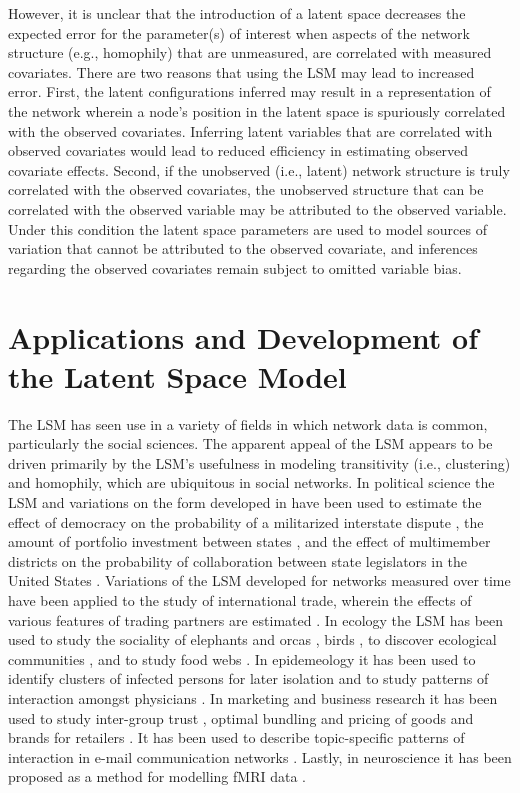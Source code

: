 \documentclass[11pt]{article}
\begin{document}
However, it is unclear that the introduction of a latent space decreases the expected error for the parameter(s) of interest when aspects of the network structure (e.g., homophily) that are unmeasured, are correlated with measured covariates. There are two reasons that using the LSM may lead to increased error. First, the latent configurations inferred may result in a representation of the network wherein a node's position in the latent space is spuriously correlated with the observed covariates. Inferring latent variables that are correlated with observed covariates would lead to reduced efficiency in estimating observed covariate effects. Second, if the unobserved (i.e., latent) network structure is truly correlated with the observed covariates, the unobserved structure that can be correlated with the observed variable may be attributed to the observed variable. Under this condition the latent space parameters are used to model sources of variation that cannot be attributed to the observed covariate, and inferences regarding the observed covariates remain subject to omitted variable bias. 

\section{Applications and Development of the Latent Space Model}

The LSM has seen use in a variety of fields in which network data is common, particularly the social sciences. The apparent appeal of the LSM appears to be driven primarily by the LSM's usefulness in modeling transitivity (i.e., clustering) and homophily, which are ubiquitous in social networks. In political science the LSM and variations on the form developed in \cite{hoff2002latent} have been used to estimate the effect of democracy on the probability of a militarized interstate dispute \citep{ward2007disputes}, the amount of portfolio investment between states \citep{cao2013democracies}, and the effect of multimember districts on the probability of collaboration between state legislators in the United States \citep{kirkland2012multimember}. Variations of the LSM developed for networks measured over time have been applied to the study of international trade, wherein the effects of various features of trading partners are estimated \citep{ward2013gravity}. In ecology the LSM has been used to study the sociality of elephants \citep{vance2009social} and orcas \citep{fearnbach2014spatial}, birds \citep{nomano2015unrelated}, to discover ecological communities \citep{fletcher2011social, fletcher2013network}, and to study food webs \citep{chiu2011unifying}. In epidemeology it has been used to identify clusters of infected persons for later isolation \citep{zhang2015cluster} and to study patterns of interaction amongst physicians \citep{paul2014results}. In marketing and business research it has been used to study inter-group trust \citep{dass2011impact}, optimal bundling and pricing of goods and brands for retailers \citep{dass2012assessing}. It has been used to describe topic-specific patterns of interaction in e-mail communication networks \citep{krafft2012topic}.  Lastly, in neuroscience it has been proposed as a method for modelling fMRI data \citep{simpson2013analyzing}.
\end{document}
